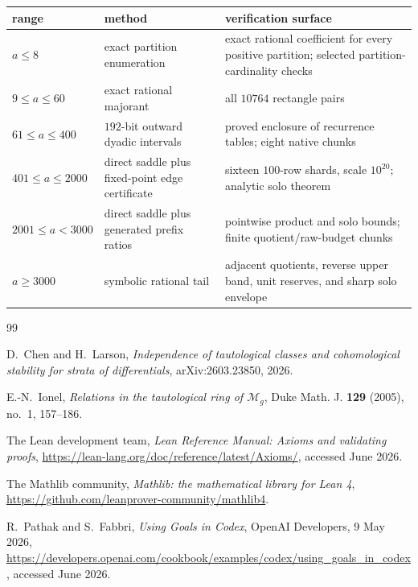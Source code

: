 \documentclass[11pt]{article}
\theoremstyle{definition}
\theoremstyle{remark}
\begin{document}
\begin{center}
\small
\begin{tabular}{p{}p{}p{}}
\toprule
range & method & verification surface\\
\midrule
$a\le8$ & exact partition enumeration & exact rational coefficient for every
positive partition; selected partition-cardinality checks\\
$9\le a\le60$ & exact rational majorant & all $10764$ rectangle pairs\\
$61\le a\le400$ & $192$-bit outward dyadic intervals & proved enclosure of
recurrence tables; eight native chunks\\
$401\le a\le2000$ & direct saddle plus fixed-point edge certificate & sixteen
$100$-row shards, scale $10^{20}$; analytic solo theorem\\
$2001\le a<3000$ & direct saddle plus generated prefix ratios & pointwise
product and solo bounds; finite quotient/raw-budget chunks\\
$a\ge3000$ & symbolic rational tail & adjacent quotients, reverse upper band,
unit reserves, and sharp solo envelope\\
\bottomrule
\end{tabular}
\end{center}

\begin{thebibliography}{99}

D.~Chen and H.~Larson,
\emph{Independence of tautological classes and cohomological stability for
strata of differentials}, arXiv:2603.23850, 2026.

E.-N.~Ionel,
\emph{Relations in the tautological ring of $\mathcal M_g$},
Duke Math. J. \textbf{129} (2005), no.~1, 157--186.

The Lean development team,
\emph{Lean Reference Manual: Axioms and validating proofs},
\url{https://lean-lang.org/doc/reference/latest/Axioms/}, accessed June 2026.

The Mathlib community,
\emph{Mathlib: the mathematical library for Lean 4},
\url{https://github.com/leanprover-community/mathlib4}.

R.~Pathak and S.~Fabbri,
\emph{Using Goals in Codex}, OpenAI Developers, 9 May 2026,
\url{https://developers.openai.com/cookbook/examples/codex/using_goals_in_codex},
accessed June 2026.

\end{thebibliography}
\end{document}
